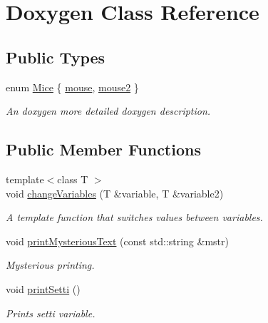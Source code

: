 \hypertarget{classDoxygen}{\section{Doxygen Class Reference}
\label{classDoxygen}
}
\subsection*{Public Types}
\begin{DoxyCompactItemize}
\item 
enum \hyperlink{classDoxygen_aa357d9d47e3f1d78d20029894f927379}{Mice} \{ \hyperlink{classDoxygen_aa357d9d47e3f1d78d20029894f927379a9d6156a0661afa9b73da2cdd97ca5e71}{mouse}, 
\hyperlink{classDoxygen_aa357d9d47e3f1d78d20029894f927379a6c89fd478d71f650e90e79313744a22a}{mouse2}
 \}
\begin{DoxyCompactList}\small\item\em An doxygen more detailed doxygen description. \end{DoxyCompactList}\end{DoxyCompactItemize}
\subsection*{Public Member Functions}
\begin{DoxyCompactItemize}
\item 
{\footnotesize template$<$class T $>$ }\\void \hyperlink{classDoxygen_ac0292355fe89971baba0552261a81a43}{change\-Variables} (T \&variable, T \&variable2)
\begin{DoxyCompactList}\small\item\em A template function that switches values between variables. \end{DoxyCompactList}\item 
void \hyperlink{classDoxygen_ada3101a3a7a100ffbe84521d9cc33b91}{print\-Mysterious\-Text} (const std\-::string \&mstr)
\begin{DoxyCompactList}\small\item\em Mysterious printing. \end{DoxyCompactList}\item 
\hypertarget{classDoxygen_a4692ac956c41a4e0e44cb3c0bdc24986}{void \hyperlink{classDoxygen_a4692ac956c41a4e0e44cb3c0bdc24986}{print\-Setti} ()}\label{classDoxygen_a4692ac956c41a4e0e44cb3c0bdc24986}

\begin{DoxyCompactList}\small\item\em Prints setti variable. \end{DoxyCompactList}\end{DoxyCompactItemize}
